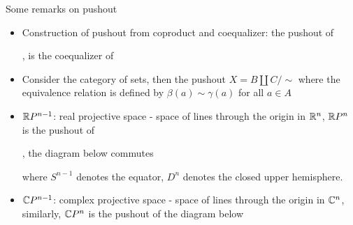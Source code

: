 \documentclass{report}
\begin{document}
\begin{remark}
    Some remarks on pushout
    \begin{itemize}
        \item Construction of pushout from coproduct and coequalizer: the pushout of , is the coequalizer of 
        \begin{center}
        \end{center}
        
    
        \item Consider the category of sets, then the pushout $X = B \amalg C / \sim$ where the equivalence relation is defined by $\beta(a) \sim \gamma(a)$ for all $a \in A$

        \item $\mathbb{R} P^{n-1}$: real projective space - space of lines through the origin in $\mathbb{R}^n$, $\mathbb{R} P^n$ is the pushout of , the diagram below commutes
        \begin{center}
        \end{center}
        where $S^{n-1}$ denotes the equator, $D^n$ denotes the closed upper hemisphere.

        \item $\mathbb{C} P^{n-1}$: complex projective space - space of lines through the origin in $\mathbb{C}^n$, similarly, $\mathbb{C} P^n$ is the pushout of the diagram below
        \begin{center}
        \end{center}
    \end{itemize}
\end{remark}
\end{document}
